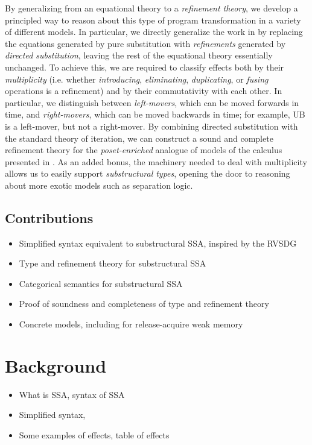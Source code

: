 \documentclass[acmsmall,screen,review]{acmart}
\begin{document}
By generalizing from an equational theory to a \emph{refinement theory}, we develop a principled way
to reason about this type of program transformation in a variety of different models. In particular,
we directly generalize the work in \citet{ghalayini-24-ssa-densem-arxiv} by replacing the equations
generated by pure substitution with \emph{refinements} generated by \emph{directed substitution},
leaving the rest of the equational theory essentially unchanged. To achieve this, we are required to
classify effects both by their \emph{multiplicity} (i.e. whether \emph{introducing},
\emph{eliminating}, \emph{duplicating}, or \emph{fusing} operations is a refinement) and by their
commutativity with each other. In particular, we distinguish between \emph{left-movers}, which can
be moved forwards in time, and \emph{right-movers}, which can be moved backwards in time; for
example, UB is a left-mover, but not a right-mover. By combining directed substitution with the
standard theory of iteration, we can construct a sound and complete refinement theory for the
\emph{poset-enriched} analogue of models of the calculus presented in
\citet{ghalayini-24-ssa-densem-arxiv}. As an added bonus, the machinery needed to deal with
multiplicity allows us to easily support \emph{substructural types}, opening the door to reasoning
about more exotic models such as separation logic.

\subsection{Contributions}

\begin{itemize}
  \item Simplified syntax equivalent to substructural SSA, inspired by the RVSDG
  \item Type and refinement theory for substructural SSA
  \item Categorical semantics for substructural SSA
  \item Proof of soundness and completeness of type and refinement theory
  \item Concrete models, including for release-acquire weak memory
\end{itemize}

\section{Background}

\begin{itemize}
  \item What is SSA, syntax of SSA
  \item Simplified syntax, \citet{ghalayini-24-ssa-densem-arxiv}
  \item Some examples of effects, table of effects
\end{itemize}
\end{document}
